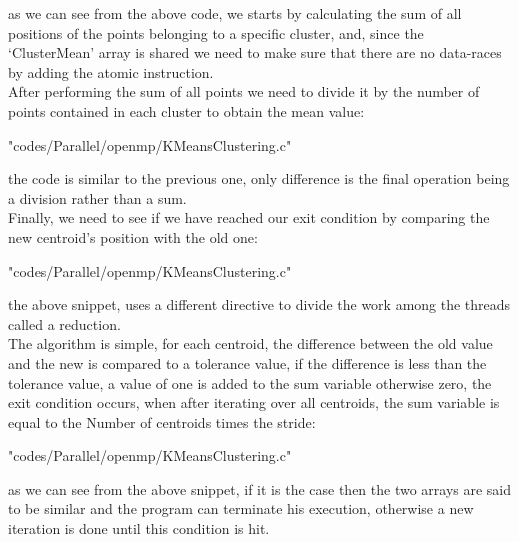 \documentclass[10pt,twocolumn,letterpaper]{article}
\begin{document}
as we can see from the above code, we starts by calculating the sum of all positions of the points belonging to a specific 
cluster, and, since the `ClusterMean' array is shared we need to make sure that there are no data-races by adding 
the atomic instruction.\\
After performing the sum of all points we need to divide it by the number of points contained in each cluster to obtain the 
mean value:\\
\begin{lstinputlisting}[language=C,style=CSnippetStyle,caption=OpenMP Mean Calculation II,firstline=74,lastline=84]
					   {"codes/Parallel/openmp/KMeansClustering.c"}
\end{lstinputlisting}
the code is similar to the previous one, only difference is the final operation being a division rather than a sum.\\
Finally, we need to see if we have reached our exit condition by comparing the new centroid's position with the old one:\\
\begin{lstinputlisting}[language=C,style=CSnippetStyle,caption=OpenMP Centroid's Position Comparison,firstline=86,lastline=96]
					   {"codes/Parallel/openmp/KMeansClustering.c"}
\end{lstinputlisting}
the above snippet, uses a different directive to divide the work among the threads called a reduction.\\
The algorithm is simple, for each centroid, the difference between the old value and the new is compared to a tolerance value,
if the difference is less than the tolerance value, a value of one is added to the sum variable otherwise zero, the exit 
condition occurs, when after iterating over all centroids, the sum variable is equal to the Number of centroids times the 
stride:\\
\begin{lstinputlisting}[language=C,style=CSnippetStyle,caption=OpenMP Exit Condition,firstline=97,lastline=99]
					   {"codes/Parallel/openmp/KMeansClustering.c"}
\end{lstinputlisting}
as we can see from the above snippet, if it is the case then the two arrays are said to be similar and the program can 
terminate his execution, otherwise a new iteration is done until this condition is hit.\\
\end{document}
